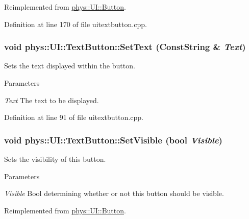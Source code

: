 Reimplemented from \hyperlink{classphys_1_1UI_1_1Button_a3f610782e5f84ddc315d9db6ef5f9109}{phys::UI::Button}.



Definition at line 170 of file uitextbutton.cpp.

\hypertarget{classphys_1_1UI_1_1TextButton_ae66f149489c4215963dc5b853c838c50}{
\subsubsection[{SetText}]{\setlength{\rightskip}{0pt plus 5cm}void phys::UI::TextButton::SetText ({\bf ConstString} \& {\em Text})}}
\label{df/d03/classphys_1_1UI_1_1TextButton_ae66f149489c4215963dc5b853c838c50}


Sets the text displayed within the button. 


\begin{DoxyParams}{Parameters}
\item[{\em Text}]The text to be displayed. \end{DoxyParams}


Definition at line 91 of file uitextbutton.cpp.

\hypertarget{classphys_1_1UI_1_1TextButton_a07e030ef92f314b1eff663cbc1712d42}{
\subsubsection[{SetVisible}]{\setlength{\rightskip}{0pt plus 5cm}void phys::UI::TextButton::SetVisible (bool {\em Visible})}}
\label{df/d03/classphys_1_1UI_1_1TextButton_a07e030ef92f314b1eff663cbc1712d42}


Sets the visibility of this button. 


\begin{DoxyParams}{Parameters}
\item[{\em Visible}]Bool determining whether or not this button should be visible. \end{DoxyParams}


Reimplemented from \hyperlink{classphys_1_1UI_1_1Button_a293a0a5296778fb3d638c31c5d9d4c75}{phys::UI::Button}.



